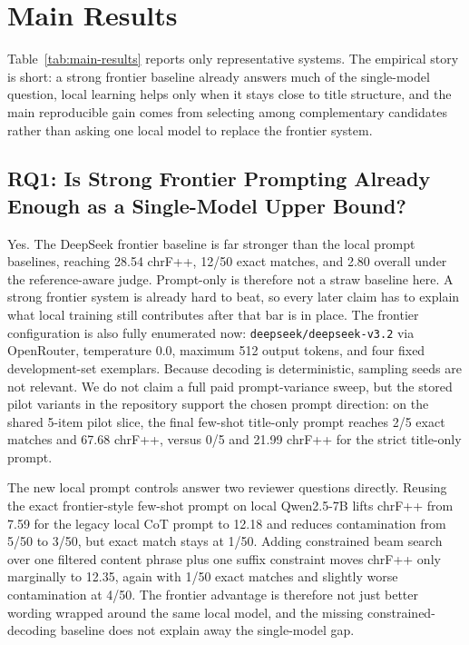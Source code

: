 \section{Main Results}

Table~\ref{tab:main-results} reports only representative systems. The empirical story is short: a strong frontier baseline already answers much of the single-model question, local learning helps only when it stays close to title structure, and the main reproducible gain comes from selecting among complementary candidates rather than asking one local model to replace the frontier system.



\subsection{RQ1: Is Strong Frontier Prompting Already Enough as a Single-Model Upper Bound?}

Yes. The DeepSeek frontier baseline is far stronger than the local prompt baselines, reaching 28.54 chrF++, 12/50 exact matches, and 2.80 overall under the reference-aware judge. Prompt-only is therefore not a straw baseline here. A strong frontier system is already hard to beat, so every later claim has to explain what local training still contributes after that bar is in place. The frontier configuration is also fully enumerated now: \texttt{deepseek/deepseek-v3.2} via OpenRouter, temperature 0.0, maximum 512 output tokens, and four fixed development-set exemplars. Because decoding is deterministic, sampling seeds are not relevant. We do not claim a full paid prompt-variance sweep, but the stored pilot variants in the repository support the chosen prompt direction: on the shared 5-item pilot slice, the final few-shot title-only prompt reaches 2/5 exact matches and 67.68 chrF++, versus 0/5 and 21.99 chrF++ for the strict title-only prompt.



The new local prompt controls answer two reviewer questions directly. Reusing the exact frontier-style few-shot prompt on local Qwen2.5-7B lifts chrF++ from 7.59 for the legacy local CoT prompt to 12.18 and reduces contamination from 5/50 to 3/50, but exact match stays at 1/50. Adding constrained beam search over one filtered content phrase plus one suffix constraint moves chrF++ only marginally to 12.35, again with 1/50 exact matches and slightly worse contamination at 4/50. The frontier advantage is therefore not just better wording wrapped around the same local model, and the missing constrained-decoding baseline does not explain away the single-model gap.

